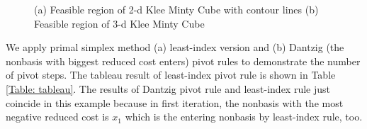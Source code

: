 \documentclass[11pt]{article}
\begin{document}
\begin{figure}
    \centering
    \caption{(a) Feasible region of 2-d Klee Minty Cube with contour lines (b) Feasible region of 3-d Klee Minty Cube}
    \label{fig:kmcube}
\end{figure}
We apply primal simplex method (a) least-index version and (b) Dantzig (the nonbasis with biggest reduced cost enters) pivot rules to demonstrate the number of pivot steps. The tableau result of least-index pivot rule is shown in Table \ref{Table: tableau}. The results of Dantzig pivot rule and least-index rule just coincide in this example because in first iteration, the nonbasis with the most negative reduced cost is $x_1$ which is the entering nonbasis by least-index rule, too. 
\end{document}
